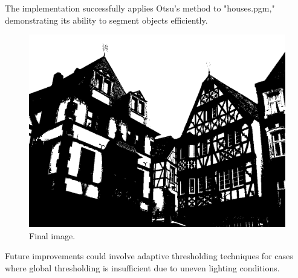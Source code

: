 The implementation successfully applies Otsu’s method to "houses.pgm," demonstrating its ability to segment objects efficiently.
\begin{figure}[H]
    \centering
    \includegraphics[width=0.65\linewidth]{../Images/binary_image.png}
    \caption{Final image.}
    \label{fig:enter-label}
\end{figure}
Future improvements could involve adaptive thresholding techniques for cases where global thresholding is insufficient due to uneven lighting conditions.